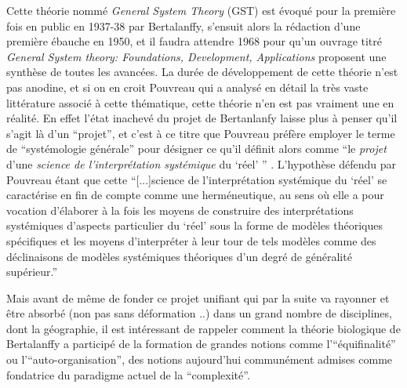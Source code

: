 Cette théorie nommé \textit{General System Theory} (GST) est évoqué pour la première fois en public en 1937-38 par Bertalanffy, s'ensuit alors la rédaction d'une première ébauche en 1950, et il faudra attendre 1968 pour qu'un ouvrage titré \textit{General System theory: Foundations, Development, Applications} proposent une synthèse de toutes les avancées. La durée de développement de cette théorie n'est pas anodine, et si on en croit Pouvreau \autocite{Pouvreau2013} qui a analysé en détail la très vaste littérature associé à cette thématique, cette théorie n'en est pas vraiment une en réalité. En effet l'état inachevé du projet de Bertanlanfy laisse plus à penser qu'il s'agit là d'un \enquote{projet}, et c'est à ce titre que Pouvreau préfère employer le terme de \enquote{systémologie générale} pour désigner ce qu'il définit alors comme \enquote{le \textit{projet} d'une \textit{science de l'interprétation systémique} du \enquote{réel} } \autocite[9]{Pouvreau2013}. L'hypothèse défendu par Pouvreau étant que cette \enquote{[...]science de l'interprétation systémique du \enquote{réel} se caractérise en fin de compte comme une herméneutique, au sens où elle a pour vocation d'élaborer à la fois les moyens de construire des interprétations systémiques d'aspects particulier du \enquote{réel} sous la forme de modèles théoriques spécifiques et les moyens d'interpréter à leur tour de tels modèles comme des déclinaisons de modèles systémiques théoriques d'un degré de généralité supérieur.}\autocite[9-10]{Pouvreau2013}

Mais avant de même de fonder ce projet unifiant qui par la suite va rayonner et être absorbé (non pas sans déformation ..) dans un grand nombre de disciplines, dont la géographie, il est intéressant de rappeler comment la théorie biologique de Bertalanffy a participé de la formation de grandes notions comme l'\enquote{équifinalité} ou l'\enquote{auto-organisation}, des notions aujourd'hui communément admises comme fondatrice du paradigme actuel de la \enquote{complexité}.

